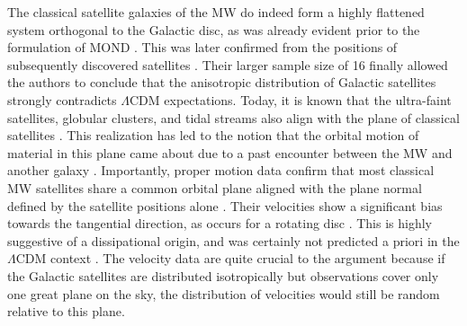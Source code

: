 \documentclass[fleqn,usenatbib,useAMS]{mnras} %
\begin{document}
The classical satellite galaxies of the MW do indeed form a highly flattened system orthogonal to the Galactic disc, as was already evident prior to the formulation of MOND \citep{Lynden_Bell_1976, Lynden_Bell_1982}. This was later confirmed from the positions of subsequently discovered satellites \citep{Kroupa_2005}. Their larger sample size of 16 finally allowed the authors to conclude that the anisotropic distribution of Galactic satellites strongly contradicts $\Lambda$CDM expectations. Today, it is known that the ultra-faint satellites, globular clusters, and tidal streams also align with the plane of classical satellites \citep{Pawlowski_2012}. This realization has led to the notion that the orbital motion of material in this plane came about due to a past encounter between the MW and another galaxy \citep{Pawlowski_2011}. Importantly, proper motion data confirm that most classical MW satellites share a common orbital plane \citep{Pawlowski_2013_VPOS, Pawlowski_2020} aligned with the plane normal defined by the satellite positions alone \citep{Isabel_2020}. Their velocities show a significant bias towards the tangential direction, as occurs for a rotating disc \citep{Cautun_2017, Riley_2019, Hammer_2021}. This is highly suggestive of a dissipational origin, and was certainly not predicted a priori in the $\Lambda$CDM context \citep{Libeskind_2009, Deason_2011}. The velocity data are quite crucial to the argument because if the Galactic satellites are distributed isotropically but observations cover only one great plane on the sky, the distribution of velocities would still be random relative to this plane.
\end{document}
